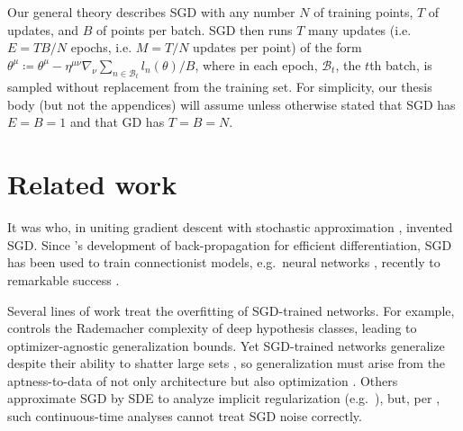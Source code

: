 \documentclass[openany, notitlepage, justified]{tufte-book}
\theoremstyle{plain}
\theoremstyle{definition}
\newcommand{\Bb}{\mathcal{B}}
\begin{document}

        Our general theory describes SGD with any number
             $N$ of training points,
             $T$ of updates, and 
             $B$ of points per batch.
        SGD then runs $T$ many updates (i.e. $E=TB/N$ epochs, i.e. $M=T/N$
        updates per point) of the form
        $
            \theta^\mu
            \coloneqq
            \theta^\mu -
            \eta^{\mu\nu} \nabla_\nu
                \sum_{n\in \Bb_t} l_n(\theta) / B
        $,
        where in each epoch, $\Bb_t$, the $t$th batch, is sampled without
        replacement from the training set.
        For simplicity, our thesis body (but not the appendices) will assume
        unless otherwise stated that SGD has $E=B=1$ and that GD has
        $T=B=N$.


\section{Related work} \label{sect:related}

    It was \citet{ki52} who, in uniting gradient descent \citep{ca47} with
    stochastic approximation \citep{ro51}, invented SGD.  Since \citet{we74}'s
    development of back-propagation for efficient differentiation, SGD has been
    used to train connectionist models, e.g.\ neural networks \citep{bo91},
    recently to remarkable success \citep{le15}.


    Several lines of work treat the overfitting of SGD-trained
    networks\cite{ne17a}.  For example, \citet{ba17} controls the Rademacher
    complexity of deep hypothesis classes, leading to optimizer-agnostic
    generalization bounds.  Yet SGD-trained networks generalize despite their
    ability to shatter large sets \citep{zh17}, so generalization must arise
    from the aptness-to-data of not only architecture but also optimization
    \citep{ne17b}.  Others approximate SGD by SDE to analyze implicit
    regularization (e.g.\ \citet{ch18}), but, per \citet{ya19a}, such
    continuous-time analyses cannot treat SGD noise correctly.
    
\end{document}
